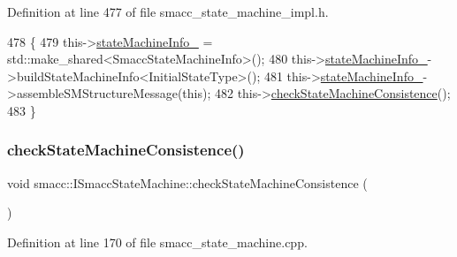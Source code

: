Definition at line 477 of file smacc\+\_\+state\+\_\+machine\+\_\+impl.\+h.


\begin{DoxyCode}
478 \{
479   this->\hyperlink{classsmacc_1_1ISmaccStateMachine_a0914aa27c3f51374c338d89a32b135d1}{stateMachineInfo\_} = std::make\_shared<SmaccStateMachineInfo>();
480   this->\hyperlink{classsmacc_1_1ISmaccStateMachine_a0914aa27c3f51374c338d89a32b135d1}{stateMachineInfo\_}->buildStateMachineInfo<InitialStateType>();
481   this->\hyperlink{classsmacc_1_1ISmaccStateMachine_a0914aa27c3f51374c338d89a32b135d1}{stateMachineInfo\_}->assembleSMStructureMessage(\textcolor{keyword}{this});
482   this->\hyperlink{classsmacc_1_1ISmaccStateMachine_af34fa8346ae3f52882704422d59b9055}{checkStateMachineConsistence}();
483 \}
\end{DoxyCode}
\mbox{\label{classsmacc_1_1ISmaccStateMachine_af34fa8346ae3f52882704422d59b9055}} 
\subsubsection{\texorpdfstring{check\+State\+Machine\+Consistence()}{checkStateMachineConsistence()}}
{\footnotesize\ttfamily void smacc\+::\+I\+Smacc\+State\+Machine\+::check\+State\+Machine\+Consistence (\begin{DoxyParamCaption}{ }\end{DoxyParamCaption})\hspace{0.3cm}{\ttfamily [protected]}}



Definition at line 170 of file smacc\+\_\+state\+\_\+machine.\+cpp.



